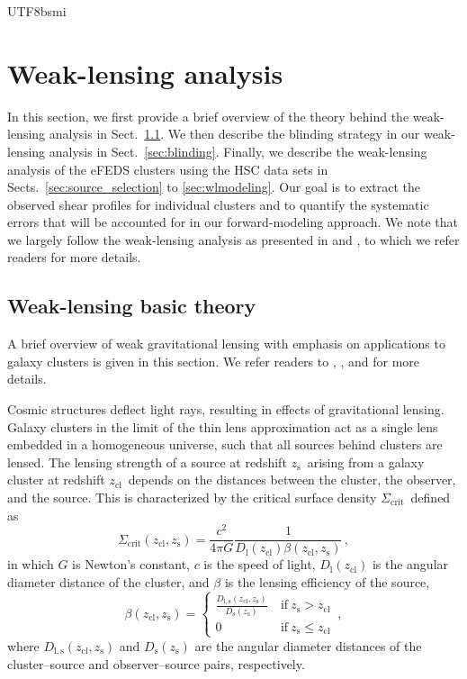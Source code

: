 \documentclass[longauth]{aa}
\newcommand{\zcl}{\ensuremath{z_{\mathrm{cl}}}}
\newcommand{\zs}{\ensuremath{z_{\mathrm{s}}}}
\newcommand{\sigmacrit}{\ensuremath{\Sigma_{\mathrm{crit}}}}
\newcommand{\lensingeff}{\ensuremath{\beta}}
\begin{document}
\begin{CJK*}{UTF8}{bsmi}
\section{Weak-lensing analysis}
\label{sec:wlanalysis}

In this section, we first provide a brief overview of the theory behind the weak-lensing analysis in Sect.~\ref{sec:basics}.
We then describe the blinding strategy in our weak-lensing analysis in Sect.~\ref{sec:blinding}.
Finally, we describe the weak-lensing analysis of the eFEDS clusters using the HSC data sets in Sects.~\ref{sec:source_selection} to \ref{sec:wlmodeling}.
Our goal is to extract the observed shear profiles for individual clusters and to quantify the systematic errors that will be accounted for in our forward-modeling approach.
We note that we largely follow the weak-lensing analysis as presented in \cite{umetsu20} and \cite{miyatake19}, to which we refer readers for more details.

\subsection{Weak-lensing basic theory}
\label{sec:basics}

A brief overview of weak gravitational lensing with emphasis on applications to galaxy clusters is given in this section.
We refer readers to \cite{bartelmann01}, \cite{hoekstra13}, and \cite{umetsu20b} for more details.

Cosmic structures deflect light rays, resulting in effects of gravitational lensing.
Galaxy clusters in the limit of the thin lens approximation act as a single lens embedded in a homogeneous universe, such that all sources behind clusters are lensed.
The  lensing strength of a source at redshift \zs\ arising from a galaxy cluster at redshift \zcl\ depends on the distances between the cluster, the observer, and the source.
This is characterized by the critical surface density \sigmacrit\ defined as
%
\begin{equation}
\label{eq:crit}
\sigmacrit\left(\zcl,\zs\right) = \frac{c^2}{4\pi G}\frac{
1
}{
D_{\mathrm{l}}\left(\zcl\right) \lensingeff\left(\zcl,\zs\right)
}
\, ,
\end{equation}
%
in which $G$ is Newton's constant, $c$ is the speed of light, $D_{\mathrm{l}}\left(\zcl\right)$ is the angular diameter distance of the cluster, and $\lensingeff$ is the lensing efficiency of the source,
%
\begin{equation}
\label{eq:beta}
\lensingeff\left(\zcl,\zs\right) = 
\begin{cases}
\frac{
D_{\mathrm{l},\mathrm{s}}\left(\zcl,\zs\right)
}{
D_{\mathrm{s}}\left(\zs\right)
} &~\mathrm{if}~\zs>\zcl \\ 
0 &~\mathrm{if}~\zs\leq\zcl 
\end{cases}
\, ,
\end{equation}
%
where $D_{\mathrm{l},\mathrm{s}}\left(\zcl,\zs\right)$ and $D_{\mathrm{s}}\left(\zs\right)$ are the angular diameter distances of the  cluster--source and observer--source pairs, respectively.


\end{CJK*}
\end{document}
